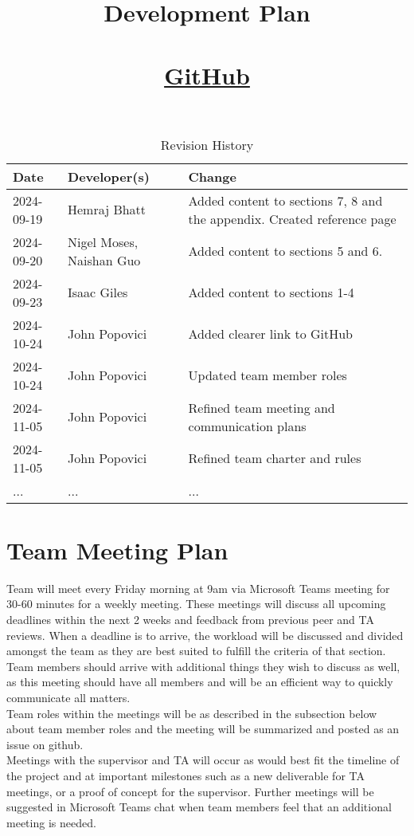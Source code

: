 \documentclass{article}
\title{Development Plan\\\progname\\\href{https://github.com/John-Popovici/duel-of-the-eights.git}{GitHub}}
\author{\authname}
\date{}
\begin{document}
\maketitle

\begin{table}[hp]
\caption{Revision History} \label{TblRevisionHistory}
\begin{tabularx}{\textwidth}{llX}
\toprule
\textbf{Date} & \textbf{Developer(s)} & \textbf{Change}\\
\midrule
2024-09-19 & Hemraj Bhatt & Added content to sections 7, 8 and the appendix. Created reference page\\
2024-09-20 & Nigel Moses, Naishan Guo & Added content to sections 5 and 6.\\
2024-09-23 & Isaac Giles & Added content to sections 1-4\\
2024-10-24 & John Popovici & Added clearer link to GitHub\\
2024-10-24 & John Popovici & Updated team member roles\\
2024-11-05 & John Popovici & Refined team meeting and communication plans\\
2024-11-05 & John Popovici & Refined team charter and rules\\
... & ... & ...\\
\bottomrule
\end{tabularx}
\end{table}

\newpage
\section{Team Meeting Plan}

Team will meet every Friday morning at 9am via Microsoft Teams meeting for 30-60 minutes for a weekly meeting. These meetings will discuss all upcoming deadlines within the next 2 weeks and feedback from previous peer and TA reviews. When a deadline is to arrive, the workload will be discussed and divided amongst the team as they are best suited to fulfill the criteria of that section.
Team members should arrive with additional things they wish to discuss as well, as this meeting should have all members and will be an efficient way to quickly communicate all matters.\\
Team roles within the meetings will be as described in the subsection below about team member roles and the meeting will be summarized and posted as an issue on github.\\
Meetings with the supervisor and TA will occur as would best fit the timeline of the project and at important milestones such as a new deliverable for TA meetings, or a proof of concept for the supervisor.
Further meetings will be suggested in Microsoft Teams chat when team members feel that an additional meeting is needed.
\end{document}
